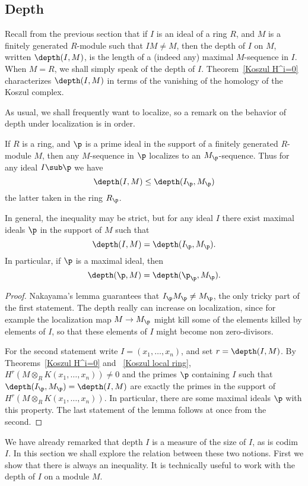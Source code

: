 \subsection{Depth}
Recall from the previous section that if $I$ is an ideal of a ring $R$, and $M$ is a finitely generated $R$-module such that $IM\neq M$, then the depth of $I$ on $M$, written $\depth(I,M)$, is the length of a (indeed any) maximal $M$-sequence in $I$. When $M=R$, we shall simply speak of the depth of $I$. Theorem~\ref{Koszul H^i=0} characterizes $\depth(I,M)$ in terms of the vanishing of the homology of the Koszul complex.\par
As usual, we shall frequently want to localize, so a remark on the behavior
of depth under localization is in order.
\begin{lemma}\label{depth locali lem}
If $R$ is a ring, and $\p$ is a prime ideal in the support of a finitely generated $R$-module $M$, then any $M$-sequence in $\p$ localizes to an $M_\p$-sequence. Thus for any ideal $I\sub\p$ we have \[\depth(I,M)\leq\depth(I_\p,M_\p)\] 
the latter taken in the ring $R_\p$.\par 
In general, the inequality may be strict, but for any ideal $I$ there exist maximal ideals $\p$ in the support of $M$ such that 
\[\depth(I,M)=\depth(I_\p,M_\p).\] 
In particular, if $\p$ is a maximal ideal, then 
\[\depth(\p,M)=\depth(\p_\p,M_\p).\]
\end{lemma}
\begin{proof}
Nakayama's lemma guarantees that $I_\p M_\p\neq M_\p$, the only tricky part of the first statement. The depth really can increase on localization,
since for example the localization map $M\to M_\p$ might kill some of the elements killed by elements of $I$, so that these elements of $I$ might become non zero-divisors.\par
For the second statement write $I=(x_1,\dots,x_n)$, and set $r=\depth(I,M)$. By Theorems~\ref{Koszul H^i=0} and ~\ref{Koszul local ring}, $H^r(M\otimes_RK(x_1,\dots,x_n))\neq0$ and the primes $\p$ containing $I$ such that $\depth(I_\p,M_\p)=\depth(I,M)$ are exactly the primes in the support of $H^r(M\otimes_RK(x_1,\dots,x_n))$. In particular, there are some maximal ideals $\p$ with this property. The last statement of the lemma follows at once from the second.
\end{proof}
We have already remarked that depth $I$ is a measure of the size of $I$, as
is codim $I$. In this section we shall explore the relation between these two notions. First we show that there is always an inequality. It is technically useful to work with the depth of $I$ on a module $M$.\par 
